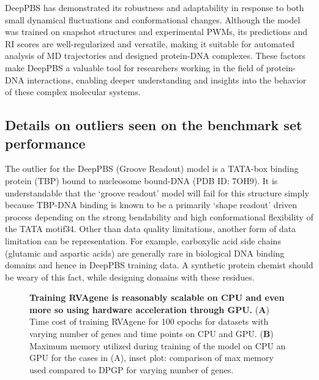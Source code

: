DeepPBS has demonstrated its robustness and adaptability in response to both small dynamical fluctuations and conformational changes. Although the model was trained on snapshot structures and experimental PWMs, its predictions and RI scores are well-regularized and versatile, making it suitable for automated analysis of MD trajectories and designed protein-DNA complexes. These factors make DeepPBS a valuable tool for researchers working in the field of protein-DNA interactions, enabling deeper understanding and insights into the behavior of these complex molecular systems.

\subsection{Details on outliers seen on the benchmark set performance}

The outlier for the DeepPBS (Groove Readout) model is a TATA-box binding protein (TBP) bound to nucleosome bound-DNA (PDB ID: 7OH9). It is understandable that the ‘groove readout’ model will fail for this structure simply because TBP-DNA binding is known to be a primarily ‘shape readout’ driven process depending on the strong bendability and high conformational flexibility of the TATA motif34. Other than data quality limitations, another form of data limitation can be representation. For example, carboxylic acid side chains (glutamic and aspartic acids) are generally rare in biological DNA binding domains and hence in DeepPBS training data. A synthetic protein chemist should be weary of this fact, while designing domains with these residues. 

\begin{center}
    \begin{figure}
        \caption[Computational cost of training RVAgene]{\textbf{Training RVAgene is reasonably scalable on CPU and even more so using hardware acceleration through GPU.} ({\bf A}) Time cost of training RVAgene for 100 epochs for datasets with varying number of genes and time points on CPU and GPU. ({\bf B}) Maximum memory utilized during training of the model on CPU an GPU for the cases in (A), inset plot: comparison of max memory used compared to DPGP for varying number of genes.}
  \label{fig:pdna5}
\end{figure}
\end{center}